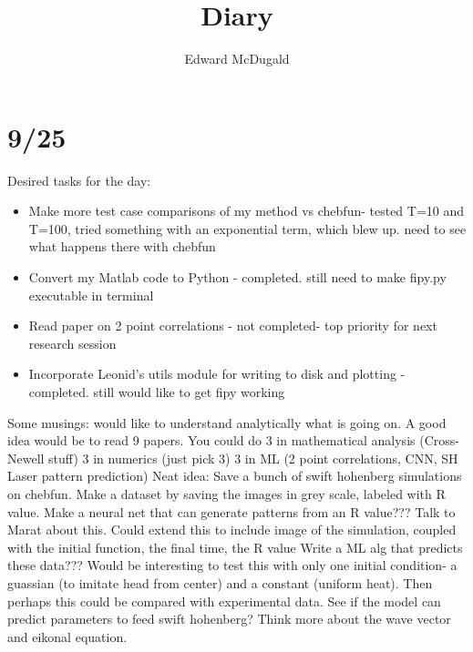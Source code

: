 \documentclass[12pt]{article}
\title{Diary}
\author{Edward McDugald}
\begin{document}
\maketitle

\section{9/25}
Desired tasks for the day:
\begin{itemize}
\item Make more test case comparisons of my method vs chebfun- tested T=10 and T=100, tried something
with an exponential term, which blew up. need to see what happens there with chebfun
\item Convert my Matlab code to Python - completed. still need to make fipy.py executable in terminal
\item Read paper on 2 point correlations - not completed- top priority for next research session
\item Incorporate Leonid's utils module for writing to disk and plotting - completed. still would like to get fipy working
\end{itemize}
Some musings: would like to understand analytically what is going on.
A good idea would be to read 9 papers.
You could do 3 in mathematical analysis (Cross-Newell stuff)
3 in numerics (just pick 3)
3 in ML (2 point correlations, CNN, SH Laser pattern prediction)
Neat idea: Save a bunch of swift hohenberg simulations on chebfun.
Make a dataset by saving the images in grey scale, labeled with R value. Make a neural net that
can generate patterns from an R value??? Talk to Marat about this.
Could extend this to include image of the simulation, coupled with the initial function, the final time, the R value
Write a ML alg that predicts these data???
Would be interesting to test this with only one initial condition- a guassian (to imitate head from center)
and a constant (uniform heat). Then perhaps this could be compared with experimental data. See if the model can predict
parameters to feed swift hohenberg?
Think more about the wave vector and eikonal equation.
\end{document}
